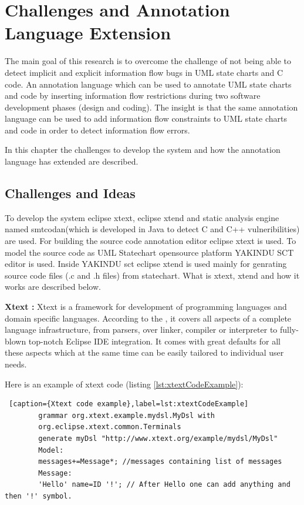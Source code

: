 \chapter{ Challenges and Annotation Language Extension}
The main goal of this research  is to overcome the challenge of not being able
to detect implicit and explicit information flow bugs in UML state charts and C code. An annotation language
which can be used to annotate UML state charts and code by inserting information flow
restrictions during two software development phases (design
and coding). The insight is that the same annotation language can be used to add information flow constraints to UML state charts and code in order to detect information flow errors.
 
In this chapter the challenges to develop the system and how the annotation language has extended are described.

\section{Challenges and Ideas}

To develop the system eclipse xtext, eclipse xtend and static analysis engine named smtcodan(which is developed in Java to detect C and C++ vulneribilities) are used. For building the source code annotation editor eclipse xtext is used. To model the source code as UML Statechart opensource platform YAKINDU SCT editor is used. Inside YAKINDU sct eclipse xtend is used mainly for genrating source code files (.c and .h files) from statechart. What is xtext, xtend and how it works are described below.

\textbf{ Xtext :} Xtext is a framework for development of programming languages and domain specific languages. According to the \cite{ref_17_xtext:grammar}, it covers all aspects of a complete language infrastructure, from parsers, over linker, compiler or interpreter to fully-blown top-notch Eclipse IDE integration. It comes with great defaults for all these aspects which at the same time can be easily tailored to individual user needs.
	
	Here is an example of xtext code (listing \ref{lst:xtextCodeExample}):
		\begin{lstlisting} [caption={Xtext code example},label=lst:xtextCodeExample]
		grammar org.xtext.example.mydsl.MyDsl with 
		org.eclipse.xtext.common.Terminals		
		generate myDsl "http://www.xtext.org/example/mydsl/MyDsl"		
		Model:
		messages+=Message*; //messages containing list of messages		
		Message:
		'Hello' name=ID '!'; // After Hello one can add anything and then '!' symbol.		
		\end{lstlisting}
		 
